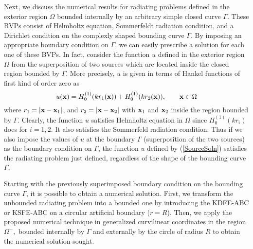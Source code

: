 \documentclass[final,3p,times,12pt]{elsarticle}
\begin{document}
Next, we discuss the numerical results for radiating problems defined in the exterior region $\Omega$ bounded internally by an arbitrary simple closed curve $\Gamma$.
These BVPs consist of Helmholtz equation, Sommerfeldt radiation condition, and a Dirichlet condition on the complexly shaped bounding curve $\Gamma$. By imposing an appropriate boundary condition on $\Gamma$, we can easily prescribe a solution for each one of these BVPs. In fact, consider the function $u$ defined in the exterior region $\Omega$ from the superposition of two sources which are located inside the closed region bounded by  $\Gamma$. More precisely, $u$ is given in terms of Hankel functions of first kind of order zero as
\begin{equation}
u({\bf{x}}) = H_0^{(1)}(k r_{1}({\bf x})) + H_0^{(1)}(k r_{2}({\bf x}) ), \qquad {\bf x}\in \Omega\label{SourceSoln}
\end{equation}
where $r_1 = |{\bf{x}}-{\bf x}_1|$, and $r_2 = |{\bf x}-{\bf x}_2|$ with ${\bf x}_1$ and ${\bf x}_2$ inside the region bounded by $\Gamma$. 
Clearly, the function $u$ satisfies Helmholtz equation in $\Omega$ since $H_0^{(1)}(k r_{i})$ does for $i=1,2$. 
It also satisfies the Sommerfeld radiation condition. Thus if we also impose the values of $u$ at the boundary $\Gamma$ (superposition of the two sources) as the boundary condition on $\Gamma$, the function $u$ defined by (\ref{SourceSoln}) satisfies the radiating problem just defined, regardless of the shape of the bounding curve $\Gamma$.

Starting with the previously superimposed boundary condition on the bounding curve $\Gamma$, it is possible to obtain a numerical solution. First, we transform the unbounded radiating problem into a bounded one by introducing the KDFE-ABC or KSFE-ABC on a circular artificial boundary ($r=R$). Then, we apply the proposed numerical technique in generalized curvilinear coordinates in the region $\Omega^{-},$ bounded internally by $\Gamma$ and externally by the circle of radius $R$ to obtain the numerical solution sought.
\end{document}
